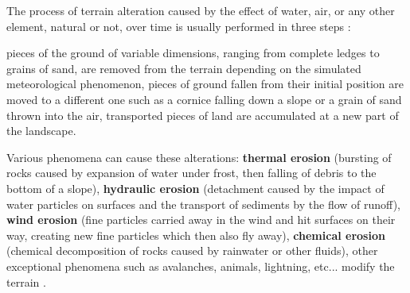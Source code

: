 The process of terrain alteration caused by the effect of water, air, or any other element, natural or not, over time is usually performed in three steps \cite{Neidhold2005}: 
\begin{Itemize}
     pieces of the ground of variable dimensions, ranging from complete ledges to grains of sand, are removed from the terrain depending on the simulated meteorological phenomenon, 
     pieces of ground fallen from their initial position are moved to a different one such as a cornice falling down a slope or a grain of sand thrown into the air, 
     transported pieces of land are accumulated at a new part of the landscape. 
\end{Itemize}

Various phenomena can cause these alterations: \textbf{thermal erosion} (bursting of rocks caused by expansion of water under frost, then falling of debris to the bottom of a slope), \textbf{hydraulic erosion} (detachment caused by the impact of water particles on surfaces and the transport of sediments by the flow of runoff), \textbf{wind erosion} (fine particles carried away in the wind and hit surfaces on their way, creating new fine particles which then also fly away), \textbf{chemical erosion} (chemical decomposition of rocks caused by rainwater or other fluids), other exceptional phenomena such as avalanches, animals, lightning, etc... modify the terrain \cite{Cordonnier2017a, Argudo2020, Cordonnier2018, Cordonnier2017b,Cordonnier2023}.


